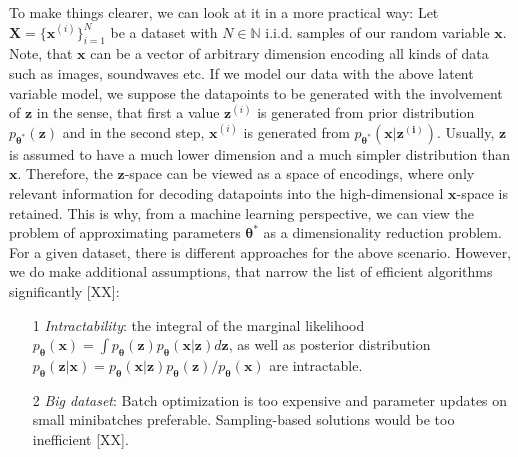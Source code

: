 \documentclass[12pt]{report}
\theoremstyle{definition}
\begin{document}
To make things clearer, we can  look at it in a more practical way: Let $\mathbf{X} = \{ \mathbf{x}^{(i)}\}_{i=1}^N$ be a dataset with $N \in \mathbb{N}$ i.i.d. samples of our random variable $\mathbf{x}$. Note, that $\mathbf{x}$ can be a vector of arbitrary dimension encoding all kinds of data such as images, soundwaves etc. If we model our data with the above latent variable model, we suppose the datapoints to be generated with the involvement of $\mathbf{z}$ in the sense, that first a value $\mathbf{z}^{(i)}$ is generated from prior distribution $p_{\mathbf{\theta^*}}(\mathbf{z})$ and in the second step, $\mathbf{x}^{(i)}$ is generated from $p_{\mathbf{\theta^*}}(\mathbf{x}|\mathbf{z^{(i)}})$. 
Usually, $\mathbf{z}$ is assumed to have a much lower dimension and a much simpler distribution than $\mathbf{x}$. Therefore, the $\mathbf{z}$-space can be viewed as a space of encodings, where only relevant information for decoding datapoints into the high-dimensional $\mathbf{x}$-space is retained. This is why, from a machine learning perspective, we can view the problem of approximating parameters $\pmb{\theta}^*$ as a dimensionality reduction problem.
For a given dataset, there is different approaches for the above scenario. However, we do make additional assumptions, that narrow the list of efficient algorithms significantly [XX]:

\begin{itemize}
	\item[1] \emph{Intractability}: the integral of the marginal likelihood $p_{\mathbf{\theta}}(\mathbf{x}) = \int p_{\mathbf{\theta}}(\mathbf{z}) p_{\mathbf{\theta}}(\mathbf{x}|\mathbf{z}) d \mathbf{z}$, as well as posterior distribution $p_{\mathbf{\theta}}(\mathbf{z}|\mathbf{x}) = p_{\mathbf{\theta}}(\mathbf{x}|\mathbf{z}) p_{\mathbf{\theta}}(\mathbf{z}) / p_{\mathbf{\theta}}(\mathbf{x})$ are intractable.
	\item[2] \emph{Big dataset}: Batch optimization is too expensive and parameter updates on small minibatches preferable. Sampling-based solutions would be too inefficient [XX].
\end{itemize}
\end{document}
